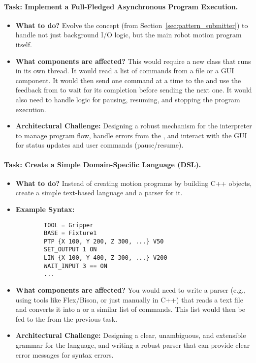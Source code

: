 \paragraph{Task: Implement a Full-Fledged Asynchronous Program Execution.}
\begin{itemize}
    \item \textbf{What to do?} Evolve the  concept (from Section~\ref{sec:pattern_submitter}) to handle not just background I/O logic, but the main robot motion program itself.
    \item \textbf{What components are affected?} This would require a new  class that runs in its own thread. It would read a list of  commands from a file or a GUI component. It would then send one command at a time to the  and use the feedback from  to wait for its completion before sending the next one. It would also need to handle logic for pausing, resuming, and stopping the program execution.
    \item \textbf{Architectural Challenge:} Designing a robust mechanism for the interpreter to manage program flow, handle errors from the , and interact with the GUI for status updates and user commands (pause/resume).
\end{itemize}

\paragraph{Task: Create a Simple Domain-Specific Language (DSL).}
\begin{itemize}
    \item \textbf{What to do?} Instead of creating motion programs by building C++  objects, create a simple text-based language and a parser for it.
    \item \textbf{Example Syntax:}
        \begin{verbatim}
        TOOL = Gripper
        BASE = Fixture1
        PTP {X 100, Y 200, Z 300, ...} V50
        SET_OUTPUT 1 ON
        LIN {X 100, Y 400, Z 300, ...} V200
        WAIT_INPUT 3 == ON
        ...
        \end{verbatim}
    \item \textbf{What components are affected?} You would need to write a parser (e.g., using tools like Flex/Bison, or just manually in C++) that reads a text file and converts it into a  or a similar list of commands. This list would then be fed to the  from the previous task.
    \item \textbf{Architectural Challenge:} Designing a clear, unambiguous, and extensible grammar for the language, and writing a robust parser that can provide clear error messages for syntax errors.
\end{itemize}

